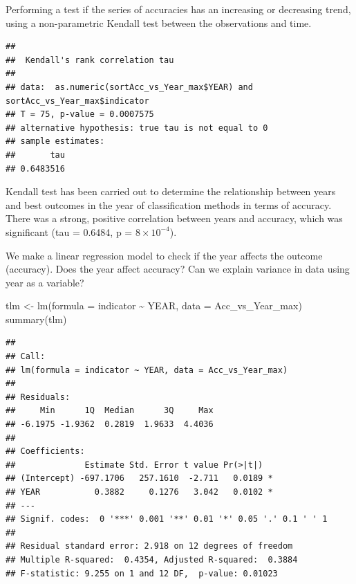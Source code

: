\documentclass[
]{article}
\newenvironment{Shaded}{\begin{snugshade}}{\end{snugshade}}
\newcommand{\AttributeTok}[1]{\textcolor[rgb]{0.77,0.63,0.00}{#1}}
\newcommand{\FunctionTok}[1]{\textcolor[rgb]{0.00,0.00,0.00}{#1}}
\newcommand{\NormalTok}[1]{#1}
\newcommand{\OtherTok}[1]{\textcolor[rgb]{0.56,0.35,0.01}{#1}}
\newcommand{\SpecialCharTok}[1]{\textcolor[rgb]{0.00,0.00,0.00}{#1}}
\newcommand{\StringTok}[1]{\textcolor[rgb]{0.31,0.60,0.02}{#1}}
\begin{document}
Performing a test if the series of accuracies has an increasing or decreasing trend, using a non-parametric Kendall test between the observations and time.

\begin{Shaded}
\end{Shaded}

\begin{verbatim}
## 
##  Kendall's rank correlation tau
## 
## data:  as.numeric(sortAcc_vs_Year_max$YEAR) and sortAcc_vs_Year_max$indicator
## T = 75, p-value = 0.0007575
## alternative hypothesis: true tau is not equal to 0
## sample estimates:
##       tau 
## 0.6483516
\end{verbatim}

Kendall test has been carried out to determine the relationship between years and best outcomes in the year of classification methods in terms of accuracy. There was a strong, positive correlation between years and accuracy, which was significant (tau = 0.6484, p = \ensuremath{8\times 10^{-4}}).

We make a linear regression model to check if the year affects the outcome (accuracy). Does the year affect accuracy? Can we explain variance in data using year as a variable?

\begin{Shaded}
\begin{Highlighting}[]
\NormalTok{tlm }\OtherTok{\textless{}{-}} \FunctionTok{lm}\NormalTok{(}\AttributeTok{formula =}\NormalTok{ indicator }\SpecialCharTok{\textasciitilde{}}\NormalTok{ YEAR, }\AttributeTok{data =}\NormalTok{ Acc\_vs\_Year\_max)}
\FunctionTok{summary}\NormalTok{(tlm)}
\end{Highlighting}
\end{Shaded}

\begin{verbatim}
## 
## Call:
## lm(formula = indicator ~ YEAR, data = Acc_vs_Year_max)
## 
## Residuals:
##     Min      1Q  Median      3Q     Max 
## -6.1975 -1.9362  0.2819  1.9633  4.4036 
## 
## Coefficients:
##              Estimate Std. Error t value Pr(>|t|)  
## (Intercept) -697.1706   257.1610  -2.711   0.0189 *
## YEAR           0.3882     0.1276   3.042   0.0102 *
## ---
## Signif. codes:  0 '***' 0.001 '**' 0.01 '*' 0.05 '.' 0.1 ' ' 1
## 
## Residual standard error: 2.918 on 12 degrees of freedom
## Multiple R-squared:  0.4354, Adjusted R-squared:  0.3884 
## F-statistic: 9.255 on 1 and 12 DF,  p-value: 0.01023
\end{verbatim}
\end{document}

